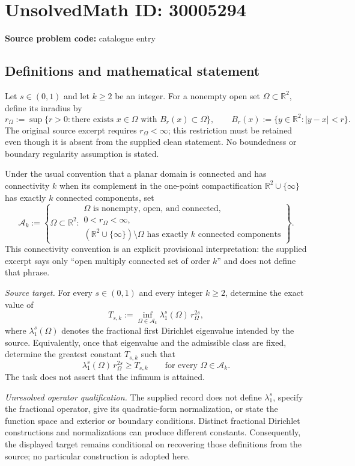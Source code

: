 \documentclass[11pt]{article}
\newcommand{\R}{\mathbb{R}}
\begin{document}
\section*{UnsolvedMath ID: 30005294}
\textbf{Source problem code:} catalogue entry
\subsection{Definitions and mathematical statement}
Let \(s\in(0,1)\) and let \(k\geq2\) be an integer. For a nonempty open set \(\Omega\subset\R^2\), define its inradius by
\[
r_\Omega:=\sup\{r>0:\text{there exists }x\in\Omega\text{ with }B_r(x)\subset\Omega\},
\qquad B_r(x):=\{y\in\R^2:|y-x|<r\}.
\]
The original source excerpt requires \(r_\Omega<\infty\); this restriction must be retained even though it is absent from the supplied clean statement. No boundedness or boundary regularity assumption is stated.

Under the usual convention that a planar domain is connected and has connectivity \(k\) when its complement in the one-point compactification \(\R^2\cup\{\infty\}\) has exactly \(k\) connected components, set
\[
\mathcal A_k:=\left\{\Omega\subset\R^2:
\begin{array}{l}
\Omega\text{ is nonempty, open, and connected},\\
0<r_\Omega<\infty,\\
(\R^2\cup\{\infty\})\setminus\Omega
\text{ has exactly }k\text{ connected components}
\end{array}\right\}.
\]
This connectivity convention is an explicit provisional interpretation: the supplied excerpt says only ``open multiply connected set of order \(k\)'' and does not define that phrase.

\emph{Source target.} For every \(s\in(0,1)\) and every integer \(k\geq2\), determine the exact value of
\[
T_{s,k}:=\inf_{\Omega\in\mathcal A_k}
\lambda_1^s(\Omega)\,r_\Omega^{2s},
\]
where \(\lambda_1^s(\Omega)\) denotes the fractional first Dirichlet eigenvalue intended by the source. Equivalently, once that eigenvalue and the admissible class are fixed, determine the greatest constant \(T_{s,k}\) such that
\[
\lambda_1^s(\Omega)\,r_\Omega^{2s}\geq T_{s,k}
\qquad\text{for every }\Omega\in\mathcal A_k.
\]
The task does not assert that the infimum is attained.

\emph{Unresolved operator qualification.} The supplied record does not define \(\lambda_1^s\), specify the fractional operator, give its quadratic-form normalization, or state the function space and exterior or boundary conditions. Distinct fractional Dirichlet constructions and normalizations can produce different constants. Consequently, the displayed target remains conditional on recovering those definitions from the source; no particular construction is adopted here.
\end{document}

